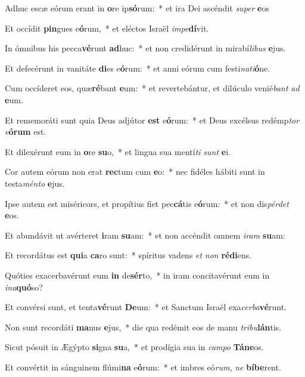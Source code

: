 \item Adhuc escæ eórum erant in \textbf{o}re ip\textbf{só}rum:~* et ira Dei ascéndit \textit{su}\textit{per} \textbf{e}os
\item Et occídit \textbf{pin}gues e\textbf{ó}rum,~* et eléctos Israël \textit{im}\textit{pe}\textbf{dí}vit.
\item In ómnibus his pecca\textbf{vé}runt \textbf{ad}huc:~* et non credidérunt in mirabí\textit{li}\textit{bus} \textbf{e}jus.
\item Et defecérunt in vanitáte \textbf{di}es e\textbf{ó}rum:~* et anni eórum cum festi\textit{na}\textit{ti}\textbf{ó}ne.
\item Cum occíderet eos, quæ\textbf{ré}bant \textbf{e}um:~* et revertebántur, et dilúculo venié\textit{bant} \textit{ad} \textbf{e}um.
\item Et rememoráti sunt quia Deus adjútor \textbf{est} e\textbf{ó}rum:~* et Deus excélsus redémp\textit{tor} \textit{e}\textbf{ó}\textbf{rum} est.
\item Et dilexérunt eum in \textbf{o}re \textbf{su}o,~* et lingua sua mentí\textit{ti} \textit{sunt} \textbf{e}i.
\item Cor autem eórum non erat \textbf{rec}tum cum \textbf{e}o:~* nec fidéles hábiti sunt in testa\textit{mén}\textit{to} \textbf{e}jus.
\item Ipse autem est miséricors, et propítius fiet pec\textbf{cá}tis e\textbf{ó}rum:~* et non dis\textit{pér}\textit{det} \textbf{e}os.
\item Et abundávit ut avérteret \textbf{i}ram \textbf{su}am:~* et non accéndit omnem \textit{i}\textit{ram} \textbf{su}am:
\item Et recordátus est \textbf{qui}a \textbf{ca}ro sunt:~* spíritus vadens \textit{et} \textit{non} \textbf{réd}\textbf{i}ens.
\item Quóties exacerbavérunt eum \textbf{in} de\textbf{sér}to,~* in iram concitavérunt eum in \textit{in}\textit{a}\textbf{quó}so?
\item Et convérsi sunt, et tenta\textbf{vé}runt \textbf{De}um:~* et Sanctum Israël exa\textit{cer}\textit{ba}\textbf{vé}runt.
\item Non sunt recordáti \textbf{ma}nus \textbf{e}jus,~* die qua redémit eos de manu \textit{tri}\textit{bu}\textbf{lán}tis.
\item Sicut pósuit in Ægýpto \textbf{si}gna \textbf{su}a,~* et prodígia sua in \textit{cam}\textit{po} \textbf{Tá}\textbf{ne}os.
\item Et convértit in sánguinem flúmi\textbf{na} e\textbf{ó}rum:~* et imbres eó\textit{rum}, \textit{ne} \textbf{bí}\textbf{be}rent.
